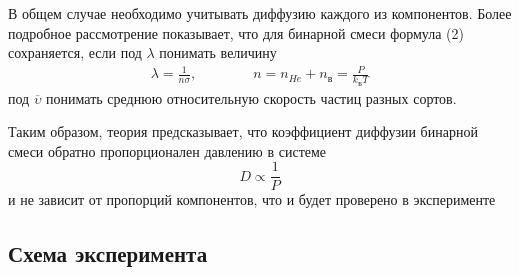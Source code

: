 \documentclass[a4paper,12pt]{article}
\theoremstyle{plain} %
\theoremstyle{definition} %
\theoremstyle{remark} %
\begin{document}
В общем случае необходимо учитывать диффузию каждого из компонентов. Более подробное рассмотрение показывает, что для бинарной смеси формула (2) сохраняется, если под $\lambda$ понимать величину 
\begin{equation*}
\begin{aligned}
\lambda = \frac{1}{n\sigma}, & & & & & n = n_{He}+n_\text{в} = \frac{P}{k_\text{Б}T}
\end{aligned}
\end{equation*}
под $\overline{\upsilon}$
понимать среднюю относительную скорость частиц разных сортов.

Таким образом, теория предсказывает, что коэффициент диффузии бинарной смеси обратно пропорционален давлению в системе 
\[D \propto \frac{1}{P}\]
и не зависит от пропорций компонентов, что и будет проверено в эксперименте

\subsection{Схема эксперимента}
\end{document}
